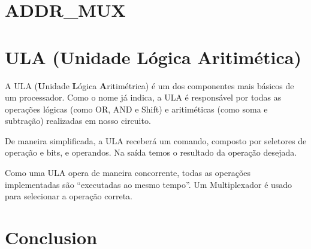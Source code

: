 \documentclass{article}
\begin{document}
\section{ADDR\_MUX}
\lipsum[1]

\section{ULA (Unidade Lógica Aritimética)}

A ULA (\textbf{U}nidade \textbf{L}ógica \textbf{A}ritimétrica) é um dos componentes mais básicos de um processador. Como o nome já indica, a ULA é responsável por todas as operações lógicas (como OR, AND e Shift) e aritiméticas (como soma e subtração) realizadas em nosso circuito.

De maneira simplificada, a ULA receberá um comando, composto por seletores de operação e bits, e operandos. Na saída temos o resultado da operação desejada.

Como uma ULA opera de maneira concorrente, todas as operações implementadas são ``executadas ao mesmo tempo''. Um Multiplexador é usado para selecionar a operação correta.

\section{Conclusion}
\lipsum[4]
\end{document}
